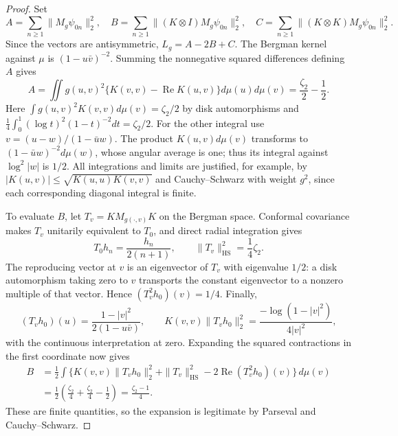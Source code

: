 \documentclass[11pt,a4paper]{article}
\numberwithin{equation}{section}
\theoremstyle{definition}
\theoremstyle{remark}
\begin{document}
\begin{proof}
Set
\[
 A=\sum_{n\ge1}\|M_g\psi_{0n}\|_2^2,\quad
 B=\sum_{n\ge1}\|(K\otimes I)M_g\psi_{0n}\|_2^2,\quad
 C=\sum_{n\ge1}\|(K\otimes K)M_g\psi_{0n}\|_2^2.
\]
Since the vectors are antisymmetric, $L_g=A-2B+C$.
The Bergman kernel against $\mu$ is $(1-u\bar v)^{-2}$.  Summing
the nonnegative squared differences defining $A$ gives
\[
 A=\iint g(u,v)^2\{K(v,v)-\operatorname{Re}K(u,v)\}
                         d\mu(u)d\mu(v)=\frac{\zeta_2}{2}-\frac12.
\]
Here $\int g(u,v)^2 K(v,v)d\mu(v)=\zeta_2/2$ by disk
automorphisms and
$\tfrac14\int_0^1(\log t)^2(1-t)^{-2}dt=\zeta_2/2$.
For the other integral use $v=(u-w)/(1-\bar u w)$.
The product $K(u,v)d\mu(v)$ transforms to
$(1-\bar u w)^{-2}d\mu(w)$, whose angular average is one;
thus its integral against $\log^2|w|$ is $1/2$.
All integrations and limits are justified, for example, by
$|K(u,v)|\le\sqrt{K(u,u)K(v,v)}$ and Cauchy--Schwarz with
weight $g^2$, since each corresponding diagonal integral is finite.

To evaluate $B$, let $T_v=KM_{g(\cdot,v)}K$ on the Bergman space.
Conformal covariance makes $T_v$ unitarily equivalent to $T_0$,
and direct radial integration gives
\[
 T_0h_n=\frac{h_n}{2(n+1)},\qquad
 \|T_v\|_{\mathrm{HS}}^2=\frac14\zeta_2.
\]
The reproducing vector at $v$ is an eigenvector of $T_v$ with
eigenvalue $1/2$: a disk automorphism taking zero to $v$ transports
the constant eigenvector to a nonzero multiple of that vector.
Hence $(T_v^2h_0)(v)=1/4$.  Finally,
\[
 (T_vh_0)(u)=\frac{1-|v|^2}{2(1-u\bar v)},\qquad
 K(v,v)\|T_vh_0\|_2^2
       =\frac{-\log(1-|v|^2)}{4|v|^2},
\]
with the continuous interpretation at zero.  Expanding the squared
contractions in the first coordinate now gives
\begin{align*}
 B&=\frac12\int\{K(v,v)\|T_vh_0\|_2^2
       +\|T_v\|_{\mathrm{HS}}^2
       -2\operatorname{Re}(T_v^2h_0)(v)\}\,d\mu(v)\\
  &=\frac12\left(\frac{\zeta_2}{4}
                      +\frac{\zeta_2}{4}-\frac12\right)
    =\frac{\zeta_2-1}{4}.
\end{align*}
These are finite quantities, so the expansion is legitimate by
Parseval and Cauchy--Schwarz.


\end{proof}
\end{document}
